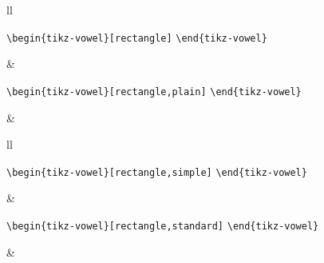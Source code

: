 \documentclass{article}
\def\\{}%
\begin{document}
\begin{center}
\begin{tabular}{ll}
  \begin{minipage}[t]{6.5cm}{\small
    \verb|\begin{tikz-vowel}[rectangle]|\\
    \verb|\end{tikz-vowel}|\\}
  \end{minipage} &
  \begin{minipage}[t]{6.5cm}{\small
    \verb|\begin{tikz-vowel}[rectangle,plain]|\\
    \verb|\end{tikz-vowel}|\\}
  \end{minipage} \\
  \begin{minipage}[t]{6.5cm}{
  \begin{tikz-vowel}[rectangle]\end{tikz-vowel} \\}\end{minipage} &
  \begin{minipage}[t]{6.5cm}{
  \begin{tikz-vowel}\end{tikz-vowel} \\}\end{minipage}
\end{tabular}

\begin{tabular}{ll}
  \begin{minipage}[t]{6.5cm}{\small
    \verb|\begin{tikz-vowel}[rectangle,simple]|\\
    \verb|\end{tikz-vowel}|\\}
  \end{minipage} &
  \begin{minipage}[t]{6.5cm}{\small
    \verb|\begin{tikz-vowel}[rectangle,standard]|\\
    \verb|\end{tikz-vowel}|\\}
  \end{minipage} \\
  \begin{minipage}[t]{6.5cm}{
  \begin{tikz-vowel}\end{tikz-vowel} \\}\end{minipage} &
  \begin{minipage}[t]{6.5cm}{
  \begin{tikz-vowel}\end{tikz-vowel} \\}\end{minipage}
\end{tabular}


\end{center}
\end{document}
